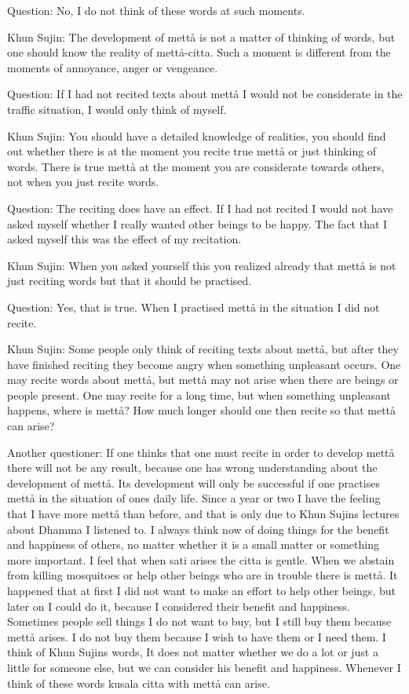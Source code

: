 \documentclass[12pt,twoside]{article}
\begin{document}
Question: No, I do not think of these words at such moments. 

Khun Sujin: The development of mett{\aa} is not a matter of thinking of
words, but one should know the reality of mett{\aa}{}-citta. Such a
moment is different from the moments of annoyance, anger or vengeance. 

Question: If I had not recited texts about mett{\aa} I would not be
considerate in the traffic situation, I would only think of myself. 

Khun Sujin: You should have a detailed knowledge of realities, you
should find out whether there is at the moment you recite true
mett{\aa} or just thinking of words. There is true mett{\aa} at the
moment you are considerate towards others, not when you just recite
words. 

Question: The reciting does have an effect. If I had not recited I would
not have asked myself whether I really wanted other beings to be happy.
The fact that I asked myself this was the effect of my recitation. 

Khun Sujin: When you asked yourself this you realized already that
mett{\aa} is not just reciting words but that it should be practised. 

Question: Yes, that is true. When I practised mett{\aa} in the situation
I did not recite. 

Khun Sujin: Some people only think of reciting texts about mett{\aa},
but after they have finished reciting they become angry when something
unpleasant occurs. One may recite words about mett{\aa}, but mett{\aa}
may not arise when there are beings or people present. One may recite
for a long time, but when something unpleasant happens, where is
mett{\aa}? How much longer should one then recite so that mett{\aa} can
arise?

Another questioner: If one thinks that one must recite in order to
develop mett{\aa} there will not be any result, because one has wrong
understanding about the development of mett{\aa}. Its development will
only be successful if one practises mett{\aa} in the situation of
one{\textquotesingle}s daily life. Since a year or two I have the
feeling that I have more mett{\aa} than before, and that is only due to
Khun Sujin{\textquotesingle}s lectures about Dhamma I listened to. I
always think now of doing things for the benefit and happiness of
others, no matter whether it is a small matter or something more
important. I feel that when sati arises the citta is gentle. When we
abstain from killing mosquitoes or help other beings who are in trouble
there is mett{\aa}. It happened that at first I did not want to make an
effort to help other beings, but later on I could do it, because I
considered their benefit and happiness. Sometimes people sell things I
do not want to buy, but I still buy them because mett{\aa} arises. I do
not buy them because I wish to have them or I need them. I think of
Khun Sujin{\textquotesingle}s words,
{\textasciigrave}{\textasciigrave}It does not matter whether we do a
lot or just a little for someone else, but we can consider his benefit
and happiness.{\textquotesingle}{\textquotesingle} Whenever I think of
these words kusala citta with mett{\aa} can arise. 
\end{document}
